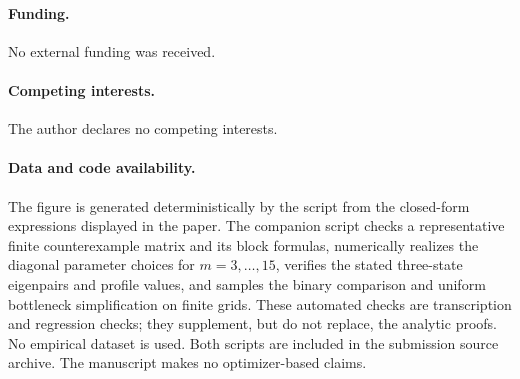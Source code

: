 \documentclass[11pt]{article}
\begin{document}
\paragraph{Funding.}
No external funding was received.

\paragraph{Competing interests.}
The author declares no competing interests.

\paragraph{Data and code availability.}
The figure is generated deterministically by the script
 from the closed-form
expressions displayed in the paper.  The companion script
 checks a representative finite
counterexample matrix and its block formulas, numerically realizes the
diagonal parameter choices for \(m=3,\ldots,15\), verifies the stated
three-state eigenpairs and profile values, and samples the binary comparison
and uniform bottleneck simplification on finite grids.  These automated
checks are transcription and regression checks; they supplement, but do not
replace, the analytic proofs.  No empirical dataset is used.  Both scripts
are included in the submission source archive.  The manuscript makes no
optimizer-based claims.
\end{document}
